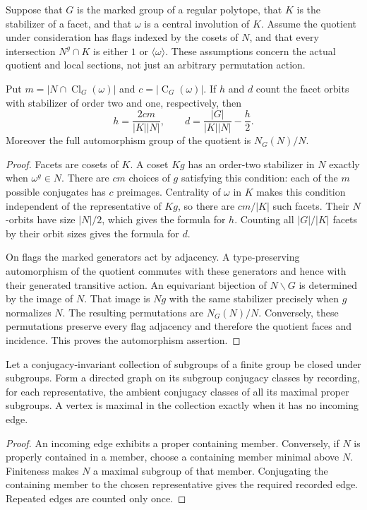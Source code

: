 \documentclass[11pt,a4paper]{article}
\newcommand{\Cl}{\operatorname{Cl}}\newcommand{\Aut}{\operatorname{Aut}}\newcommand{\Cen}{\operatorname{C}}
\begin{document}
Suppose that $G$ is the marked group of a regular polytope, that $K$ is the stabilizer of a facet, and that $\omega$ is a central involution of $K$. Assume the quotient under consideration has flags indexed by the cosets of $N$, and that every intersection $N^g\cap K$ is either $1$ or $\langle\omega\rangle$. These assumptions concern the actual quotient and local sections, not just an arbitrary permutation action.
\begin{proposition}\label{facets}
Put $m=|N\cap\Cl_G(\omega)|$ and $c=|\Cen_G(\omega)|$. If $h$ and $d$ count the facet orbits with stabilizer of order two and one, respectively, then
\[
 h=\frac{2cm}{|K||N|},\qquad
 d=\frac{|G|}{|K||N|}-\frac h2.
\]
Moreover the full automorphism group of the quotient is $N_G(N)/N$.
\end{proposition}
\begin{proof}
Facets are cosets of $K$. A coset $Kg$ has an order-two stabilizer in $N$ exactly when $\omega^g\in N$. There are $cm$ choices of $g$ satisfying this condition: each of the $m$ possible conjugates has $c$ preimages. Centrality of $\omega$ in $K$ makes this condition independent of the representative of $Kg$, so there are $cm/|K|$ such facets. Their $N$-orbits have size $|N|/2$, which gives the formula for $h$. Counting all $|G|/|K|$ facets by their orbit sizes gives the formula for $d$.

On flags the marked generators act by adjacency. A type-preserving automorphism of the quotient commutes with these generators and hence with their generated transitive action. An equivariant bijection of $N\backslash G$ is determined by the image of $N$. That image is $Ng$ with the same stabilizer precisely when $g$ normalizes $N$. The resulting permutations are $N_G(N)/N$. Conversely, these permutations preserve every flag adjacency and therefore the quotient faces and incidence. This proves the automorphism assertion.
\end{proof}

\begin{lemma}\label{maxima}
Let a conjugacy-invariant collection of subgroups of a finite group be closed under subgroups. Form a directed graph on its subgroup conjugacy classes by recording, for each representative, the ambient conjugacy classes of all its maximal proper subgroups. A vertex is maximal in the collection exactly when it has no incoming edge.
\end{lemma}
\begin{proof}
An incoming edge exhibits a proper containing member. Conversely, if $N$ is properly contained in a member, choose a containing member minimal above $N$. Finiteness makes $N$ a maximal subgroup of that member. Conjugating the containing member to the chosen representative gives the required recorded edge. Repeated edges are counted only once.
\end{proof}
\end{document}
